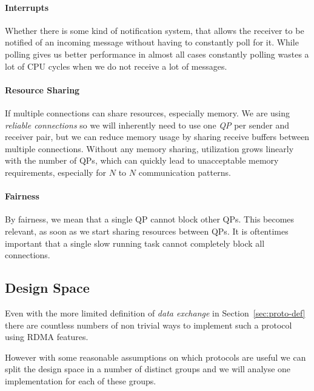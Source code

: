 \paragraph{Interrupts} Whether there is some kind of notification system, that allows the receiver to be notified 
of an incoming message without having to constantly poll for it. While polling gives us better performance in almost all cases
constantly polling wastes a lot of CPU cycles when we do not receive a lot of messages.

\paragraph{Resource Sharing} If multiple connections can share resources, especially memory. We are using \emph{reliable connections}
so we will inherently need to use one \emph{QP} per sender and receiver pair, but we can reduce memory usage by sharing receive 
buffers between multiple connections. Without any memory sharing, utilization grows linearly with the number of QPs, which 
can quickly lead to unacceptable memory requirements, especially for $N$ to $N$ communication patterns.

\paragraph{Fairness} By fairness, we mean that a single QP cannot block other QPs. This becomes relevant, as soon as we start
sharing resources between QPs. It is oftentimes important that a single slow running task cannot completely block all 
connections.




\subsection{Design Space}

Even with the more limited definition of \emph{data exchange} in Section~\ref{sec:proto-def} there are countless numbers
of non trivial ways to implement such a protocol using RDMA features. 

However with some reasonable assumptions on which protocols are useful we can split the design space 
in a number of distinct groups and we will analyse one implementation for each of these groups.



